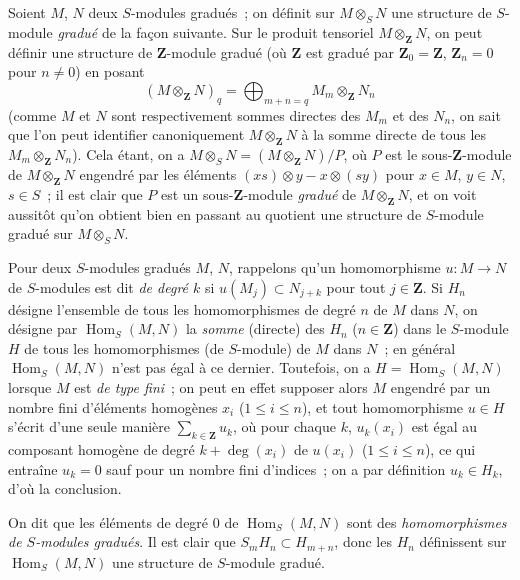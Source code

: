 \begin{env}[2.1.2]
\label{II.2.1.2-fr}
Soient $M$, $N$ deux $S$-modules gradués~; on définit sur $M\otimes_S N$ une
structure de $S$-module \emph{gradué} de la façon suivante. Sur le produit
tensoriel $M\otimes_{\mathbf{Z}}N$, on peut définir une structure de
$\mathbf{Z}$-module gradué (où $\mathbf{Z}$ est gradué par
$\mathbf{Z}_0=\mathbf{Z}$, $\mathbf{Z}_n=0$ pour $n\ne0$) en posant
\[
  (M\otimes_{\mathbf{Z}}N)_q
  =\bigoplus_{m+n=q}M_m\otimes_{\mathbf{Z}}N_n
\]
(comme $M$ et $N$ sont respectivement sommes directes des $M_m$ et des
$N_n$, on sait que l'on peut identifier canoniquement
$M\otimes_{\mathbf{Z}}N$ à la somme directe de tous les
$M_m\otimes_{\mathbf{Z}}N_n$). Cela étant, on a
$M\otimes_S N=(M\otimes_{\mathbf{Z}}N)/P$, où $P$ est le
sous-$\mathbf{Z}$-module de $M\otimes_{\mathbf{Z}}N$ engendré par les
éléments $(xs)\otimes y-x\otimes(sy)$ pour $x\in M$, $y\in N$, $s\in S$~;
il est clair que $P$ est un sous-$\mathbf{Z}$-module \emph{gradué} de
$M\otimes_{\mathbf{Z}}N$, et on voit aussitôt qu'on obtient bien en passant
au quotient une structure de $S$-module gradué sur $M\otimes_S N$.

Pour deux $S$-modules gradués $M$, $N$, rappelons qu'un homomorphisme
$u:M\to N$ de $S$-modules est dit \emph{de degré $k$} si
$u(M_j)\subset N_{j+k}$ pour tout $j\in\mathbf{Z}$. Si $H_n$ désigne
l'ensemble de tous les homomorphismes de degré $n$ de $M$ dans $N$, on
désigne par $\operatorname{Hom}_S(M,N)$ la \emph{somme} (directe) des $H_n$
($n\in\mathbf{Z}$) dans le $S$-module $H$ de tous les homomorphismes (de
$S$-module) de $M$ dans $N$~; en général $\operatorname{Hom}_S(M,N)$ n'est
pas égal à ce dernier. Toutefois, on a $H=\operatorname{Hom}_S(M,N)$ lorsque
$M$ est \emph{de type fini}~; on peut en effet supposer alors $M$ engendré
par un nombre fini d'éléments homogènes $x_i$ ($1\leq i\leq n$), et tout
homomorphisme $u\in H$ s'écrit d'une seule manière
$\sum_{k\in\mathbf{Z}}u_k$, où pour chaque $k$, $u_k(x_i)$ est égal au
composant homogène de degré $k+\deg(x_i)$ de $u(x_i)$ ($1\leq i\leq n$), ce
qui entraîne $u_k=0$ sauf pour un nombre fini d'indices~; on a par définition
$u_k\in H_k$, d'où la conclusion.

On dit que les éléments de degré $0$ de $\operatorname{Hom}_S(M,N)$ sont des
\emph{homomorphismes de $S$-modules gradués}. Il est clair que
$S_mH_n\subset H_{m+n}$, donc les $H_n$ définissent sur
$\operatorname{Hom}_S(M,N)$ une structure de $S$-module gradué.


\end{env}
